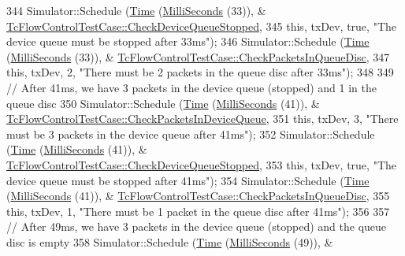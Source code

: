 \begin{DoxyCode}
344       Simulator::Schedule (\hyperlink{classns3_1_1Time}{Time} (\hyperlink{group__timecivil_gaf26127cf4571146b83a92ee18679c7a9}{MilliSeconds} (33)), &
      \hyperlink{classTcFlowControlTestCase_a4ccc9564c9142984fa8041f67b4a518a}{TcFlowControlTestCase::CheckDeviceQueueStopped},
345                           \textcolor{keyword}{this}, txDev, \textcolor{keyword}{true}, \textcolor{stringliteral}{"The device queue must be stopped after 33ms"});
346       Simulator::Schedule (\hyperlink{classns3_1_1Time}{Time} (\hyperlink{group__timecivil_gaf26127cf4571146b83a92ee18679c7a9}{MilliSeconds} (33)), &
      \hyperlink{classTcFlowControlTestCase_ac6d0b6a74dd29a21369bf1d26795098d}{TcFlowControlTestCase::CheckPacketsInQueueDisc},
347                           \textcolor{keyword}{this}, txDev, 2, \textcolor{stringliteral}{"There must be 2 packets in the queue disc after 33ms"});
348 
349       \textcolor{comment}{// After 41ms, we have 3 packets in the device queue (stopped) and 1 in the queue disc}
350       Simulator::Schedule (\hyperlink{classns3_1_1Time}{Time} (\hyperlink{group__timecivil_gaf26127cf4571146b83a92ee18679c7a9}{MilliSeconds} (41)), &
      \hyperlink{classTcFlowControlTestCase_a7ad467b39fdb155daea4b048619f6d12}{TcFlowControlTestCase::CheckPacketsInDeviceQueue},
351                           \textcolor{keyword}{this}, txDev, 3, \textcolor{stringliteral}{"There must be 3 packets in the device queue after 41ms"});
352       Simulator::Schedule (\hyperlink{classns3_1_1Time}{Time} (\hyperlink{group__timecivil_gaf26127cf4571146b83a92ee18679c7a9}{MilliSeconds} (41)), &
      \hyperlink{classTcFlowControlTestCase_a4ccc9564c9142984fa8041f67b4a518a}{TcFlowControlTestCase::CheckDeviceQueueStopped},
353                           \textcolor{keyword}{this}, txDev, \textcolor{keyword}{true}, \textcolor{stringliteral}{"The device queue must be stopped after 41ms"});
354       Simulator::Schedule (\hyperlink{classns3_1_1Time}{Time} (\hyperlink{group__timecivil_gaf26127cf4571146b83a92ee18679c7a9}{MilliSeconds} (41)), &
      \hyperlink{classTcFlowControlTestCase_ac6d0b6a74dd29a21369bf1d26795098d}{TcFlowControlTestCase::CheckPacketsInQueueDisc},
355                           \textcolor{keyword}{this}, txDev, 1, \textcolor{stringliteral}{"There must be 1 packet in the queue disc after 41ms"});
356 
357       \textcolor{comment}{// After 49ms, we have 3 packets in the device queue (stopped) and the queue disc is empty}
358       Simulator::Schedule (\hyperlink{classns3_1_1Time}{Time} (\hyperlink{group__timecivil_gaf26127cf4571146b83a92ee18679c7a9}{MilliSeconds} (49)), &

\end{DoxyCode}
